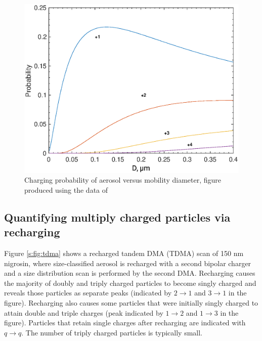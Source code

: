 \documentclass[12pt]{article}
\begin{document}
\begin{figure}[htp]
\centering
\includegraphics[scale=0.7]{fig_supp_probability.eps}
\caption{Charging probability of aerosol versus mobility diameter, figure produced using the data of \citet{RN10}}
\label{s:fig:probability}
\end{figure}

\subsection{Quantifying multiply charged particles via recharging}

Figure \ref{s:fig:tdma} shows a recharged tandem DMA (TDMA) scan of 150 nm nigrosin, where size-classified aerosol is recharged with a second bipolar charger and a size distribution scan is performed by the second DMA. Recharging causes the majority of doubly and triply charged particles to become singly charged and reveals those particles as separate peaks (indicated by $2\rightarrow 1$ and $3\rightarrow 1$ in the figure). Recharging also causes some particles that were initially singly charged to attain double and triple charges (peak indicated by $1\rightarrow 2$ and $1\rightarrow 3$ in the figure). Particles that retain single charges after recharging are indicated with $q\rightarrow q$. The number of triply charged particles is typically small.
\end{document}
